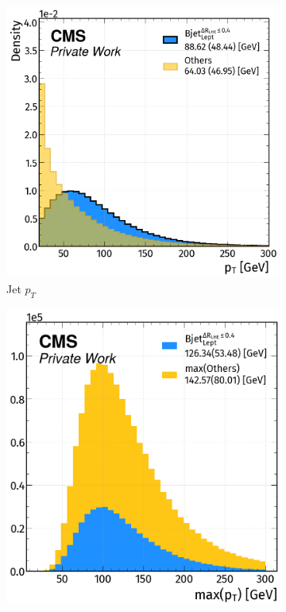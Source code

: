 \begin{figure}[H]
    \vspace{-0.5cm}
    \centering
    \begin{subfigure}{0.47\linewidth}
        \centering
        \includegraphics[width=1\linewidth]{fig//chap08-kin_reco/Jet_pt.png}
        \caption{Jet $p_T$}
    \end{subfigure}
    \hfill
    \begin{subfigure}{0.4306\linewidth}  
        \centering
        \includegraphics[width=1\linewidth]{fig//chap08-kin_reco/max_Pt.png}

\end{subfigure}
\end{figure}
